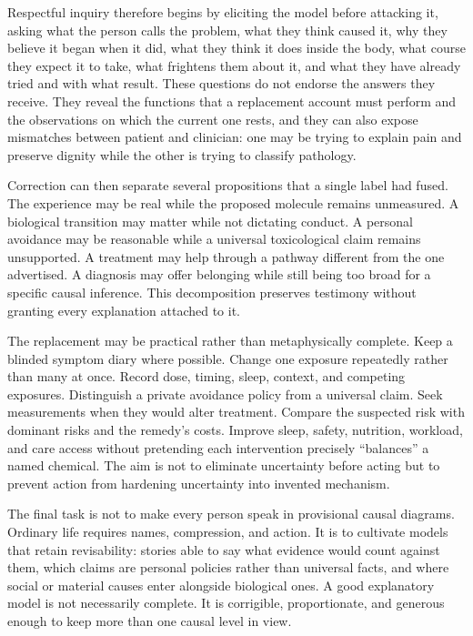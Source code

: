 \documentclass[11pt]{article}
\begin{document}
Respectful inquiry therefore begins by eliciting the model before attacking it, asking what the person calls the problem, what they think caused it, why they believe it began when it did, what they think it does inside the body, what course they expect it to take, what frightens them about it, and what they have already tried and with what result. These questions do not endorse the answers they receive. They reveal the functions that a replacement account must perform and the observations on which the current one rests, and they can also expose mismatches between patient and clinician: one may be trying to explain pain and preserve dignity while the other is trying to classify pathology.

Correction can then separate several propositions that a single label had fused. The experience may be real while the proposed molecule remains unmeasured. A biological transition may matter while not dictating conduct. A personal avoidance may be reasonable while a universal toxicological claim remains unsupported. A treatment may help through a pathway different from the one advertised. A diagnosis may offer belonging while still being too broad for a specific causal inference. This decomposition preserves testimony without granting every explanation attached to it.

The replacement may be practical rather than metaphysically complete. Keep a blinded symptom diary where possible. Change one exposure repeatedly rather than many at once. Record dose, timing, sleep, context, and competing exposures. Distinguish a private avoidance policy from a universal claim. Seek measurements when they would alter treatment. Compare the suspected risk with dominant risks and the remedy's costs. Improve sleep, safety, nutrition, workload, and care access without pretending each intervention precisely ``balances'' a named chemical. The aim is not to eliminate uncertainty before acting but to prevent action from hardening uncertainty into invented mechanism.

The final task is not to make every person speak in provisional causal diagrams. Ordinary life requires names, compression, and action. It is to cultivate models that retain revisability: stories able to say what evidence would count against them, which claims are personal policies rather than universal facts, and where social or material causes enter alongside biological ones. A good explanatory model is not necessarily complete. It is corrigible, proportionate, and generous enough to keep more than one causal level in view.
\end{document}
